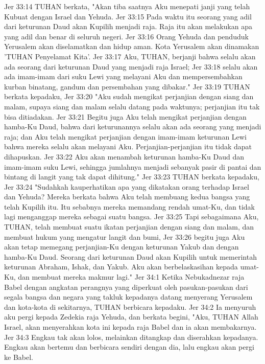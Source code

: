 Jer 33:14  TUHAN berkata, "Akan tiba saatnya Aku menepati janji yang telah Kubuat dengan Israel dan Yehuda.
Jer 33:15  Pada waktu itu seorang yang adil dari keturunan Daud akan Kupilih menjadi raja. Raja itu akan melakukan apa yang adil dan benar di seluruh negeri.
Jer 33:16  Orang Yehuda dan penduduk Yerusalem akan diselamatkan dan hidup aman. Kota Yerusalem akan dinamakan 'TUHAN Penyelamat Kita'.
Jer 33:17  Aku, TUHAN, berjanji bahwa selalu akan ada seorang dari keturunan Daud yang menjadi raja Israel;
Jer 33:18  selalu akan ada imam-imam dari suku Lewi yang melayani Aku dan mempersembahkan kurban binatang, gandum dan persembahan yang dibakar."
Jer 33:19  TUHAN berkata kepadaku,
Jer 33:20  "Aku sudah mengikat perjanjian dengan siang dan malam, supaya siang dan malam selalu datang pada waktunya; perjanjian itu tak bisa ditiadakan.
Jer 33:21  Begitu juga Aku telah mengikat perjanjian dengan hamba-Ku Daud, bahwa dari keturunannya selalu akan ada seorang yang menjadi raja; dan Aku telah mengikat perjanjian dengan imam-imam keturunan Lewi bahwa mereka selalu akan melayani Aku. Perjanjian-perjanjian itu tidak dapat dihapuskan.
Jer 33:22  Aku akan menambah keturunan hamba-Ku Daud dan imam-imam suku Lewi, sehingga jumlahnya menjadi sebanyak pasir di pantai dan bintang di langit yang tak dapat dihitung."
Jer 33:23  TUHAN berkata kepadaku,
Jer 33:24  "Sudahkah kauperhatikan apa yang dikatakan orang terhadap Israel dan Yehuda? Mereka berkata bahwa Aku telah membuang kedua bangsa yang telah Kupilih itu. Itu sebabnya mereka memandang rendah umat-Ku, dan tidak lagi menganggap mereka sebagai suatu bangsa.
Jer 33:25  Tapi sebagaimana Aku, TUHAN, telah membuat suatu ikatan perjanjian dengan siang dan malam, dan membuat hukum yang mengatur langit dan bumi,
Jer 33:26  begitu juga Aku akan tetap memegang perjanjian-Ku dengan keturunan Yakub dan dengan hamba-Ku Daud. Seorang dari keturunan Daud akan Kupilih untuk memerintah keturunan Abraham, Ishak, dan Yakub. Aku akan berbelaskasihan kepada umat-Ku, dan membuat mereka makmur lagi."
Jer 34:1  Ketika Nebukadnezar raja Babel dengan angkatan perangnya yang diperkuat oleh pasukan-pasukan dari segala bangsa dan negara yang takluk kepadanya datang menyerang Yerusalem dan kota-kota di sekitarnya, TUHAN berbicara kepadaku.
Jer 34:2  Ia menyuruh aku pergi kepada Zedekia raja Yehuda, dan berkata begini, "Aku, TUHAN Allah Israel, akan menyerahkan kota ini kepada raja Babel dan ia akan membakarnya.
Jer 34:3  Engkau tak akan lolos, melainkan ditangkap dan diserahkan kepadanya. Engkau akan bertemu dan berbicara sendiri dengan dia, lalu engkau akan pergi ke Babel.
